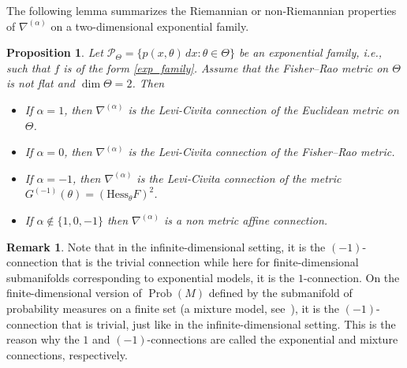 \documentclass[11pt,reqno]{amsart}
\newtheorem{proposition}[theorem]{Proposition}
\theoremstyle{definition}
\newtheorem{remark}[theorem]{Remark}
\newcommand{\Prob}{\operatorname{Prob}(M)}
\newcommand{\na}{\nabla^{(\alpha)}}
\newcommand{\orange}[1]{{\color{orange}#1}}
\begin{document}
%
The following lemma summarizes the Riemannian or non-Riemannian properties of $\na$ on a two-dimensional exponential family. 
\begin{proposition}\label{prop:exponential}
Let $\mathcal P_\Theta = \{p(x,\theta)\,dx: \theta\in\Theta\}$ be an exponential family, i.e., such that $f$ is of the form \eqref{exp_family}. Assume that the Fisher--Rao metric on $\Theta$ is not flat and $\dim\Theta=2$. Then
\begin{itemize}
\item If $\alpha=1$, then $\nabla^{(\alpha)}$ is the Levi-Civita connection of the Euclidean metric on $\Theta$.
\item If $\alpha=0$, then $\nabla^{(\alpha)}$ is the Levi-Civita connection of the Fisher--Rao metric.
\item If $\alpha=-1$, then $\nabla^{(\alpha)}$ is the Levi-Civita connection of the metric $G^{(-1)}(\theta)=(\mathrm{Hess}_\theta F)^2$.
\item If $\alpha \notin\{1,0,-1\}$ then $\nabla^{(\alpha)}$ is a non metric affine connection.
\end{itemize}
\end{proposition}
\begin{remark}
Note that in the infinite-dimensional setting, it is the $(-1)$-connection that is the trivial connection while here for finite-dimensional submanifolds corresponding to exponential models, it is the $1$-connection. %
On the finite-dimensional version of $\Prob$ defined by the submanifold of probability measures on a finite set (a mixture model, see~\cite{amari2000methods}), it is the $(-1)$-connection that is trivial, just like in the infinite-dimensional setting. This is the reason why the $1$ and $(-1)$-connections are called the exponential and mixture connections, respectively.
\end{remark}
\end{document}
